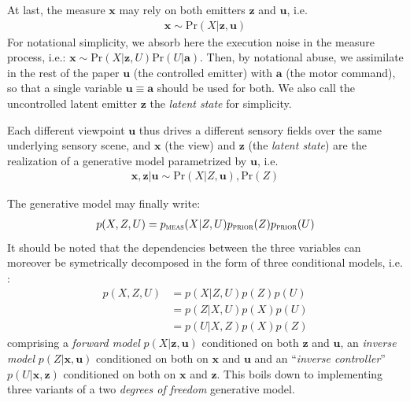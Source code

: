 \documentclass[12pt,twoside,openright]{article}
\begin{document}
At last, the measure $\boldsymbol{x}$ may rely on both emitters $\boldsymbol{z}$ and $\boldsymbol{u}$, i.e. 
\begin{align}
\boldsymbol{x} \sim \text{Pr}(X|\boldsymbol{z}, \boldsymbol{u})
\end{align} 
For notational simplicity, we absorb here the execution noise \cite{van2004role} in the measure process, i.e.:
$\boldsymbol{x} \sim \text{Pr}(X|\boldsymbol{z}, U)\text{Pr}(U|\boldsymbol{a})$.
Then, by notational abuse, we assimilate in the rest of the paper  $\boldsymbol{u}$ (the controlled emitter) with $\boldsymbol{a}$ (the motor command), so that 
a single variable $\boldsymbol{u} \equiv \boldsymbol{a}$ should be used for both. We also call the uncontrolled latent emitter $\boldsymbol{z}$ the \emph{latent state} for simplicity.

Each different viewpoint $\boldsymbol{u}$ thus drives a different sensory fields over the same underlying sensory scene, and $\boldsymbol{x}$ (the view) and $\boldsymbol{z}$ (the \emph{latent state}) are the realization of a generative model parametrized by $\boldsymbol{u}$, i.e.
\begin{align}
\boldsymbol{x}, \boldsymbol{z} | \boldsymbol{u} \sim \text{Pr}(X|Z, \boldsymbol{u}), \text{Pr}(Z)
\end{align}  

The generative model may finally write:
\begin{align}
p(X, Z, U) = p_\text{\sc meas}(X| Z, U)p_\text{\sc prior}(Z) p_\text{\sc prior}(U)
\end{align}
It should be noted that the dependencies between the three variables can moreover be symetrically decomposed in the form of three conditional models, i.e. :
\begin{align}
p(X, Z, U) &= p(X| Z, U) p(Z)p(U)\nonumber\\ 
&= p(Z| X, U)p(X) p(U)\nonumber\\
&= p(U|X, Z)p(X) p(Z)\label{eq:three-party}
\end{align}
comprising a \emph{forward model} $p(X|\boldsymbol{z}, \boldsymbol{u})$ 
conditioned on both $\boldsymbol{z}$ and $\boldsymbol{u}$,  an \emph{inverse model} $p(Z|\boldsymbol{x}, \boldsymbol{u})$  conditioned on both on  $\boldsymbol{x}$ and $\boldsymbol{u}$ and an ``\emph{inverse controller}'' $p(U|\boldsymbol{x}, \boldsymbol{z})$ conditioned on both on  $\boldsymbol{x}$ and $\boldsymbol{z}$. This boils down to implementing three variants of a two \emph{degrees of freedom} generative model. 
\end{document}
